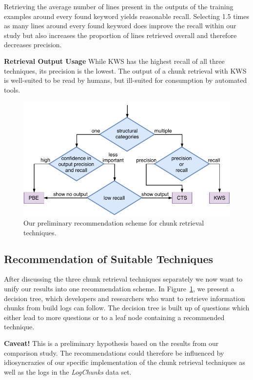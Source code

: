 Retrieving the average number of lines present in the outputs of the
training examples around every found keyword yields reasonable recall.
Selecting 1.5 times as many lines around every found keyword does
improve the recall within our study but also increases the proportion
of lines retrieved overall and therefore decreases precision.

\noindent
\textbf{Retrieval Output Usage}
While KWS has the highest recall of all three techniques, its
precision is the lowest.
The output of a chunk retrieval with KWS is
well-suited to be read by humans, but ill-suited for consumption by
automated tools.

\begin{figure}[tb]
		\centering
		\includegraphics[width=\columnwidth,
		clip]{img/crt-recommendation.pdf}
		\caption{Our preliminary recommendation scheme for chunk
		retrieval techniques.}
		\label{fig:crt-recommendation}
\end{figure}

\subsection{Recommendation of Suitable Techniques}
After discussing the three chunk retrieval techniques separately we
now want to unify our results into one recommendation scheme.
In
Figure~\ref{fig:crt-recommendation}, we present a decision tree, which
developers and researchers who want to retrieve information chunks
from build logs can follow.
The decision tree is built up of questions
which either lead to more questions or to a leaf node containing a
recommended technique.


\noindent
\textbf{Caveat!} This is a preliminary hypothesis based on the results
from our comparison study.
The recommendations could therefore be
influenced by idiosyncrazies of our specific implementation of the
chunk retrieval techniques as well as the logs in the \emph{LogChunks}
data set.

